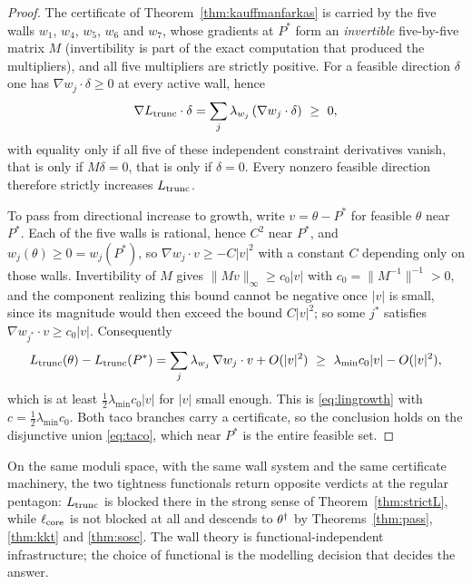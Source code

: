 \begin{proof}
The certificate of Theorem~\ref{thm:kauffmanfarkas} is carried by the five walls $w_1$, $w_4$, $w_5$, $w_6$ and $w_7$, whose gradients at $P^*$ form an \emph{invertible} five-by-five matrix $M$ (invertibility is part of the exact computation that produced the multipliers), and all five multipliers are strictly positive. For a feasible direction $\delta$ one has $\nabla w_j\cdot\delta\ge0$ at every active wall, hence
\[
  \nabla L_{\mathrm{trunc}}\cdot\delta=\sum_j\lambda_{w_j}\,(\nabla w_j\cdot\delta)\ \ge\ 0 ,
\]
with equality only if all five of these independent constraint derivatives vanish, that is only if $M\delta=0$, that is only if $\delta=0$. Every nonzero feasible direction therefore strictly increases $L_{\mathrm{trunc}}$.

To pass from directional increase to growth, write $v=\theta-P^*$ for feasible $\theta$ near $P^*$. Each of the five walls is rational, hence $C^2$ near $P^*$, and $w_j(\theta)\ge0=w_j(P^*)$, so $\nabla w_j\cdot v\ge-C\lvert v\rvert^2$ with a constant $C$ depending only on those walls. Invertibility of $M$ gives $\lVert Mv\rVert_\infty\ge c_0\lvert v\rvert$ with $c_0=\lVert M^{-1}\rVert^{-1}>0$, and the component realizing this bound cannot be negative once $\lvert v\rvert$ is small, since its magnitude would then exceed the bound $C\lvert v\rvert^2$; so some $j^*$ satisfies $\nabla w_{j^*}\cdot v\ge c_0\lvert v\rvert$. Consequently
\[
  L_{\mathrm{trunc}}(\theta)-L_{\mathrm{trunc}}(P^*)=\sum_j\lambda_{w_j}\,\nabla w_j\cdot v+O(\lvert v\rvert^2)
  \ \ge\ \lambda_{\min}c_0\lvert v\rvert-O(\lvert v\rvert^2),
\]
which is at least $\frac12\lambda_{\min}c_0\lvert v\rvert$ for $\lvert v\rvert$ small enough. This is \eqref{eq:lingrowth} with $c=\frac12\lambda_{\min}c_0$. Both taco branches carry a certificate, so the conclusion holds on the disjunctive union \eqref{eq:taco}, which near $P^*$ is the entire feasible set.
\end{proof}

\begin{corollary}\label{cor:dichotomy}
On the same moduli space, with the same wall system and the same certificate machinery, the two tightness functionals return opposite verdicts at the regular pentagon: $L_{\mathrm{trunc}}$ is blocked there in the strong sense of Theorem~\textup{\ref{thm:strictL}}, while $\ell_{\mathrm{core}}$ is not blocked at all and descends to $\theta^\dagger$ by Theorems~\textup{\ref{thm:pass}}, \textup{\ref{thm:kkt}} and \textup{\ref{thm:sosc}}. The wall theory is functional-independent infrastructure; the choice of functional is the modelling decision that decides the answer.
\end{corollary}

